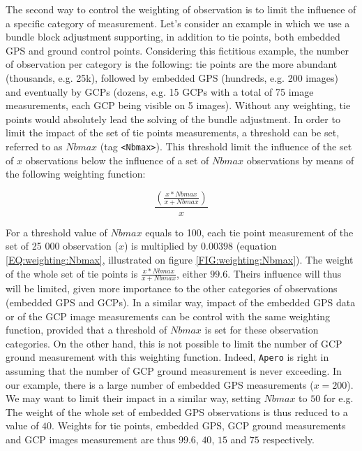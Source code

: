 The second way to control the weighting of observation is to limit the influence of a specific category of measurement.
Let's consider an example in which we use a bundle block adjustment supporting, in addition to tie points, both embedded GPS and ground control points.
Considering this fictitious example, the number of observation per category is the following: tie points are the more abundant (thousands, e.g. 25k), followed by embedded GPS (hundreds, e.g. 200 images) and eventually by GCPs (dozens, e.g. 15 GCPs with a total of 75 image measurements, each GCP being visible on 5 images).
Without any weighting, tie points would absolutely lead the solving of the bundle adjustment.
In order to limit the impact of the set of tie points measurements, a threshold can be set, referred to as $Nbmax$ (tag {\tt <Nbmax>}).
This threshold limit the influence of the set of $x$ observations below the influence of a set of $Nbmax$ observations by means of the following weighting function:

\begin{equation}
   \label{EQ:weighting:Nbmax}
     \frac{(\frac{x*Nbmax}{x+Nbmax})}{x}
\end{equation}

For a threshold value of $Nbmax$ equals to 100, each tie point measurement of the set of 25 000 observation ($x$) is multiplied by $0.00398$ (equation \ref{EQ:weighting:Nbmax}, illustrated on figure \ref{FIG:weighting:Nbmax}).
The weight of the whole set of tie points is $\frac{x*Nbmax}{x+Nbmax}$, either $99.6$.
Theirs influence will thus will be limited, given more importance to the other categories of observations (embedded GPS and GCPs).
In a similar way, impact of the embedded GPS data or of the GCP image measurements can be control with the same weighting function, provided that a threshold of $Nbmax$ is set for these observation categories.
On the other hand, this is not possible to limit the number of GCP ground measurement with this weighting function.
Indeed, {\tt Apero} is right in assuming that the number of GCP ground measurement is never exceeding.
In our example, there is a large number of embedded GPS measurements ($x= 200$). We may want to limit their impact in a similar way, setting $Nbmax$ to $50$ for e.g.
The weight of the whole set of embedded GPS observations is thus reduced to a value of $40$.
Weights for tie points, embedded GPS, GCP ground measurements and GCP images measurement are thus $99.6$, $40$, $15$ and $75$ respectively.

